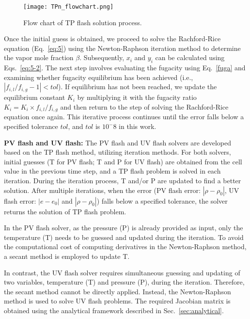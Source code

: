 \begin{figure}[htbp]
\centering
\texttt{[image: TPn\_flowchart.png]}
\caption{Flow chart of TP flash solution process.}
\label{FC} 
\end{figure}

Once the initial guess is obtained, we proceed to solve the Rachford-Rice equation (Eq.~\ref{eq:5}) using the Newton-Raphson iteration method to determine the vapor mole fraction $\beta$. Subsequently, $x_i$ and $y_i$ can be calculated using Eqs.~\ref{eq:5-2}. The next step involves evaluating the fugacity using Eq.~\ref{fuga} and examining whether fugacity equilibrium has been achieved (i.e., $\left|f_{i,l}/f_{i,g}-1\right| < tol $). If equilibrium has not been reached, we update the equilibrium constant $K_i$ by multiplying it with the fugacity ratio $K_i=K_i \times f_{i,l}/f_{i,g}$ and then return to the step of solving the Rachford-Rice equation once again. This iterative process continues until the error falls below a specified tolerance $tol$, and $tol$ is $10^-8$ in this work. 


\textbf{PV flash and UV flash:}
The PV flash and UV flash solvers are developed based on the TP flash method, utilizing iteration methods. For both solvers, initial guesses (T for PV flash; T and P for UV flash) are obtained from the cell value in the previous time step, and a TP flash problem is solved in each iteration. During the iteration process, T and/or P are updated to find a better solution. After multiple iterations, when the error (PV flash error: $|\rho - \rho_0|$, UV flash error: $|e - e_0|$ and $|\rho - \rho_0|$) falls below a specified tolerance, the solver returns the solution of TP flash problem.


In the PV flash solver, as the pressure (P) is already provided as input, only the temperature (T) needs to be guessed and updated during the iteration. To avoid the computational cost of computing derivatives in the Newton-Raphson method, a secant method is employed to update T.


In contrast, the UV flash solver requires simultaneous guessing and updating of two variables,  temperature (T) and pressure (P), during the iteration. Therefore, the secant method cannot be directly applied. Instead, the Newton-Raphson method is used to solve UV flash problems. The required Jacobian matrix is obtained using the analytical framework described in Sec.~\ref{sec:analytical}.



